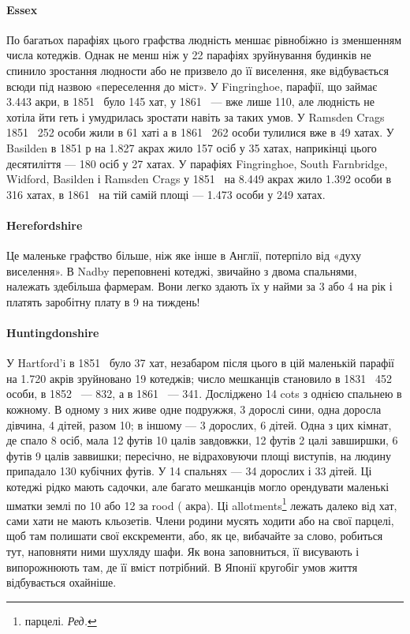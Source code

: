 \paragraph{Essex}

По багатьох парафіях цього графства людність меншає рівнобіжно
із зменшенням числа котеджів. Однак не менш ніж у
22 парафіях зруйнування будинків не спинило зростання людности
або не призвело до її виселення, яке відбувається всюди під
назвою «переселення до міст». У Fingringhoe, парафії, що займає
\num{3.443} акри, в 1851~ було 145 хат, у 1861~ — вже лише 110, але
людність не хотіла йти геть і умудрилась зростати навіть за
таких умов. У Ramsden Crags 1851~ 252 особи жили в 61 хаті
а в 1861~ 262 особи тулилися вже в 49 хатах. У Basilden в 1851 р
на \num{1.827} акрах жило 157 осіб у 35 хатах, наприкінці цього десятиліття
— 180 осіб у 27 хатах. У парафіях Fingringhoe, South
Farnbridge, Widford, Basilden і Ramsden Crags у 1851~ на
\num{8.449} акрах жило \num{1.392} особи в 316 хатах, в 1861~ на тій самій
площі — \num{1.473} особи у 249 хатах.

\paragraph{Herefordshire}

Це маленьке графство більше, ніж яке інше в Англії, потерпіло
від «духу виселення». В Nadby переповнені котеджі,
звичайно з двома спальнями, належать здебільша фармерам.
Вони легко здають їх у найми за 3 або 4 на рік
і платять заробітну плату в 9 на тиждень!

\paragraph{Huntingdonshire}

У Hartford’i в 1851~ було 37 хат, незабаром після цього
в цій маленькій парафії на \num{1.720} акрів зруйновано 19 котеджів;
число мешканців становило в 1831~ 452 особи, в 1852~ — 832,
а в 1861~ — 341. Досліджено 14 cots з однією спальнею в кожному.
В одному з них живе одне подружжя, 3 дорослі сини, одна
доросла дівчина, 4 дітей, разом 10; в іншому — 3 дорослих,
6 дітей. Одна з цих кімнат, де спало 8 осіб, мала 12 футів 10 цалів
завдовжки, 12 футів 2 цалі завширшки, 6 футів 9 цалів заввишки;
пересічно, не відраховуючи площі виступів, на людину припадало
130 кубічних футів. У 14 спальнях — 34 дорослих і 33 дітей. Ці
котеджі рідко мають садочки, але багато мешканців могло орендувати
маленькі шматки землі по 10 або 12 за rood ( акра).
Ці allotments\footnote*{
парцелі. \emph{Ред.}
} лежать далеко від хат, сами хати не мають кльозетів.
Члени родини мусять ходити або на свої парцелі, щоб там
полишати свої екскременти, або, як це, вибачайте за слово, робиться
тут, наповняти ними шухляду шафи. Як вона заповниться,
її висувають і випорожнюють там, де її вміст потрібний. В Японії
кругобіг умов життя відбувається охайніше.

